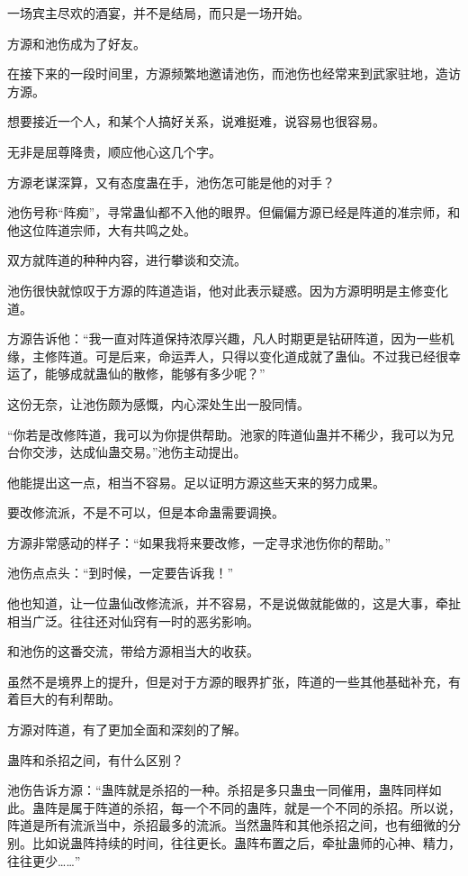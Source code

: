 
\begin{this_body}



一场宾主尽欢的酒宴，并不是结局，而只是一场开始。

方源和池伤成为了好友。

在接下来的一段时间里，方源频繁地邀请池伤，而池伤也经常来到武家驻地，造访方源。

想要接近一个人，和某个人搞好关系，说难挺难，说容易也很容易。

无非是屈尊降贵，顺应他心这几个字。

方源老谋深算，又有态度蛊在手，池伤怎可能是他的对手？

池伤号称“阵痴”，寻常蛊仙都不入他的眼界。但偏偏方源已经是阵道的准宗师，和他这位阵道宗师，大有共鸣之处。

双方就阵道的种种内容，进行攀谈和交流。

池伤很快就惊叹于方源的阵道造诣，他对此表示疑惑。因为方源明明是主修变化道。

方源告诉他：“我一直对阵道保持浓厚兴趣，凡人时期更是钻研阵道，因为一些机缘，主修阵道。可是后来，命运弄人，只得以变化道成就了蛊仙。不过我已经很幸运了，能够成就蛊仙的散修，能够有多少呢？”

这份无奈，让池伤颇为感慨，内心深处生出一股同情。

“你若是改修阵道，我可以为你提供帮助。池家的阵道仙蛊并不稀少，我可以为兄台你交涉，达成仙蛊交易。”池伤主动提出。

他能提出这一点，相当不容易。足以证明方源这些天来的努力成果。

要改修流派，不是不可以，但是本命蛊需要调换。

方源非常感动的样子：“如果我将来要改修，一定寻求池伤你的帮助。”

池伤点点头：“到时候，一定要告诉我！”

他也知道，让一位蛊仙改修流派，并不容易，不是说做就能做的，这是大事，牵扯相当广泛。往往还对仙窍有一时的恶劣影响。

和池伤的这番交流，带给方源相当大的收获。

虽然不是境界上的提升，但是对于方源的眼界扩张，阵道的一些其他基础补充，有着巨大的有利帮助。

方源对阵道，有了更加全面和深刻的了解。

蛊阵和杀招之间，有什么区别？

池伤告诉方源：“蛊阵就是杀招的一种。杀招是多只蛊虫一同催用，蛊阵同样如此。蛊阵是属于阵道的杀招，每一个不同的蛊阵，就是一个不同的杀招。所以说，阵道是所有流派当中，杀招最多的流派。当然蛊阵和其他杀招之间，也有细微的分别。比如说蛊阵持续的时间，往往更长。蛊阵布置之后，牵扯蛊师的心神、精力，往往更少……”


\end{this_body}
